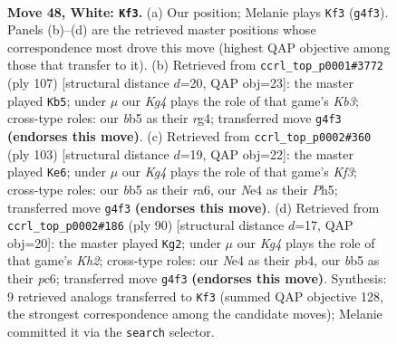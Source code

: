 \documentclass[11pt]{article}
\begin{document}
\clearpage

\begin{figure}[p]\centering
\begin{subfigure}{0.46\textwidth}\centering
\resizebox{\linewidth}{!}{%
\newchessgame
\chessboard[
  setfen={7r/4k3/8/1b2p3/pP2N1K1/R5P1/8/8 w - - 9 48},
  showmover=false,
  pgfstyle=straightmove, color=movearrow, markmove={g4-f3}
]}
\caption{}
\end{subfigure}\hfill
\begin{subfigure}{0.46\textwidth}\centering
\resizebox{\linewidth}{!}{%
\newchessgame
\chessboard[
  setfen={8/8/pk6/2p4r/6RP/3K4/P7/8 b - - 12 54},
  showmover=false,
  pgfstyle=straightmove, color=movearrow, markmove={b6-b5}
]}
\caption{}
\end{subfigure}
\\[4pt]
\begin{subfigure}{0.46\textwidth}\centering
\resizebox{\linewidth}{!}{%
\newchessgame
\chessboard[
  setfen={8/5p2/R2P1k2/3r3p/7P/5P2/5K2/8 b - - 1 52},
  showmover=false,
  pgfstyle=straightmove, color=movearrow, markmove={f6-e6}
]}
\caption{}
\end{subfigure}\hfill
\begin{subfigure}{0.46\textwidth}\centering
\resizebox{\linewidth}{!}{%
\newchessgame
\chessboard[
  setfen={4r3/1k6/2p2p1P/5R2/1p6/6P1/5P1K/8 w - - 1 46},
  showmover=false,
  pgfstyle=straightmove, color=movearrow, markmove={h2-g2}
]}
\caption{}
\end{subfigure}
\caption{\textbf{Move 48, White: \texttt{Kf3}.} (a) Our position; Melanie plays \texttt{Kf3} (\texttt{g4f3}). Panels (b)--(d) are the retrieved master positions whose correspondence most drove this move (highest QAP objective among those that transfer to it). (b) Retrieved from \texttt{ccrl\_top\_p0001\#3772} (ply 107) [structural distance $d$=20, QAP obj=23]: the master played \texttt{Kb5}; under $\mu$ our \emph{Kg4} plays the role of that game's \emph{Kb3}; cross-type roles: our \emph{b}b5 as their \emph{r}g4; transferred move \texttt{g4f3} \textbf{(endorses this move)}. (c) Retrieved from \texttt{ccrl\_top\_p0002\#360} (ply 103) [structural distance $d$=19, QAP obj=22]: the master played \texttt{Ke6}; under $\mu$ our \emph{Kg4} plays the role of that game's \emph{Kf3}; cross-type roles: our \emph{b}b5 as their \emph{r}a6, our \emph{N}e4 as their \emph{P}h5; transferred move \texttt{g4f3} \textbf{(endorses this move)}. (d) Retrieved from \texttt{ccrl\_top\_p0002\#186} (ply 90) [structural distance $d$=17, QAP obj=20]: the master played \texttt{Kg2}; under $\mu$ our \emph{Kg4} plays the role of that game's \emph{Kh2}; cross-type roles: our \emph{N}e4 as their \emph{p}b4, our \emph{b}b5 as their \emph{p}c6; transferred move \texttt{g4f3} \textbf{(endorses this move)}. Synthesis: 9 retrieved analogs transferred to \texttt{Kf3} (summed QAP objective 128, the strongest correspondence among the candidate moves); Melanie committed it via the \texttt{search} selector.}
\label{fig:thought-m94}
\end{figure}
\end{document}
